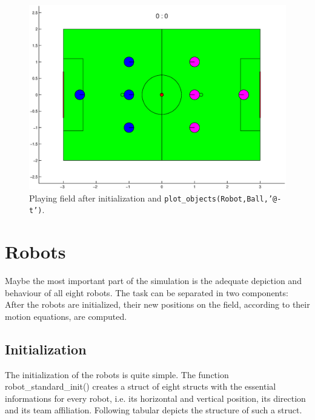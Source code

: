 \begin{figure}[h]
	\centering
    	\includegraphics[width=14cm]{./2_Simulation/playing_field_robots}
  	\caption{Playing field after initialization and \texttt{plot\_objects(Robot,Ball,'@-t')}.}
  	\label{Playing_field_robots}
\end{figure}


\section{Robots} \label{Robotsection}

Maybe the most important part of the simulation is the adequate depiction and behaviour of all eight robots. The task can be separated in two components: After the robots are initialized, their new positions on the field, according to their motion equations, are computed.

\subsection*{Initialization}
The initialization of the robots is quite simple. The function {\selectfont robot\_standard\_init()} creates a struct of eight structs with the essential informations for every robot, i.e. its horizontal and vertical position, its direction and its team affiliation. Following tabular depicts the structure of such a struct.

